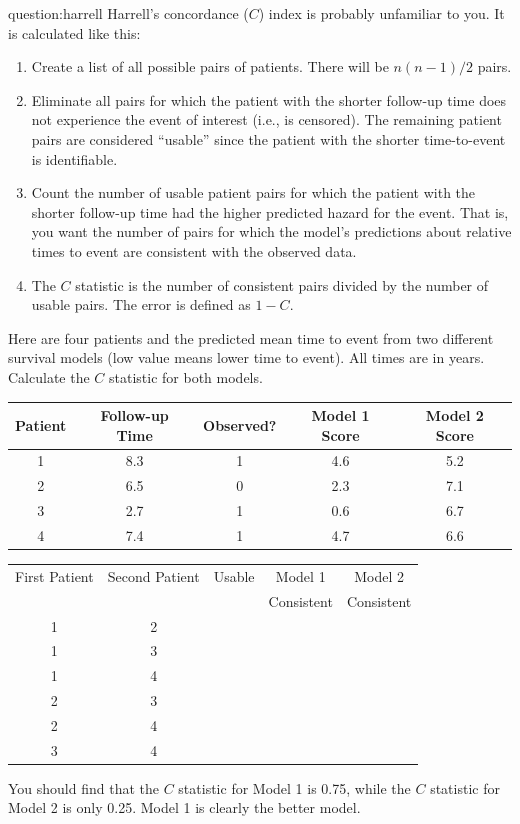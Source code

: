 \begin{question}{question:harrell}
Harrell's concordance ($C$) index is probably unfamiliar to you. It is calculated like this:
\begin{enumerate}
\item Create a list of all possible pairs of patients. There will be $n(n-1)/2$ pairs.
\item Eliminate all pairs for which the patient with the shorter follow-up time does not experience the event of interest (i.e., is censored). The remaining patient pairs are considered ``usable'' since the patient with the shorter time-to-event is identifiable. 
\item Count the number of usable patient pairs for which the patient with the shorter follow-up time had the higher predicted hazard for the event. That is, you want the number of pairs for which the model's predictions about relative times to event are consistent with the observed data.
\item The $C$ statistic is the number of consistent pairs divided by the number of usable pairs. The error is defined as $1-C$. 
\end{enumerate}
Here are four patients and the predicted mean time to event from two different survival models (low value means lower time to event). All times are in years. Calculate the $C$ statistic for both models.

    \begin{center}
    \begin{tabular}{ccccc}
    \toprule
    Patient & Follow-up Time & Observed? & Model 1 Score & Model 2 Score \\
    \midrule
    1 & 8.3 & 1 & 4.6 & 5.2 \\
    2 & 6.5 & 0 & 2.3 & 7.1 \\
    3 & 2.7 & 1 & 0.6 & 6.7 \\
    4 & 7.4 & 1 & 4.7 & 6.6 \\
    \bottomrule
    \end{tabular}
    \end{center}
    
{\small
    \begin{center}
    \begin{tabular}{ccccc}
    \toprule
    First Patient & Second Patient & Usable & Model 1 & Model 2 \\
    & & & Consistent & Consistent \\
    \midrule
    1 & 2 & \\
    1 & 3 & \\
    1 & 4 & \\
    2 & 3 & \\
    2 & 4 & \\
    3 & 4 & \\
    \bottomrule
    \end{tabular}
    \end{center}
}
You should find that the $C$ statistic for Model 1 is 0.75, while the $C$ statistic for Model 2 is only 0.25. Model 1 is clearly the better model.
\end{question}

